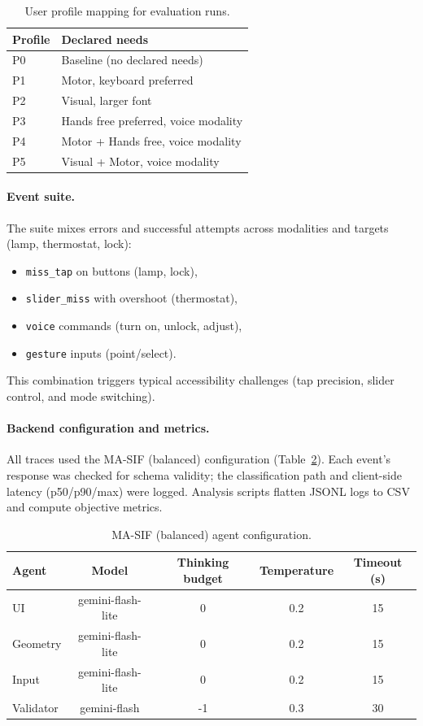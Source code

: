 \begin{table}[h]
\centering
\caption{User profile mapping for evaluation runs.}
\begin{tabular}{ll}
\toprule
\textbf{Profile} & \textbf{Declared needs} \\
\midrule
P0 & Baseline (no declared needs) \\
P1 & Motor, keyboard preferred \\
P2 & Visual, larger font \\
P3 & Hands free preferred, voice modality \\
P4 & Motor + Hands free, voice modality \\
P5 & Visual + Motor, voice modality \\
\bottomrule
\end{tabular}
\label{tab:user-profile-mapping}
\end{table}

\paragraph{Event suite.}
The suite mixes errors and successful attempts across modalities and targets (lamp, thermostat, lock):
\begin{itemize}
  \item \texttt{miss\_tap} on buttons (lamp, lock),
  \item \texttt{slider\_miss} with overshoot (thermostat),
  \item \texttt{voice} commands (turn on, unlock, adjust),
  \item \texttt{gesture} inputs (point/select).
\end{itemize}
This combination triggers typical accessibility challenges (tap precision, slider control, and mode switching).

\paragraph{Backend configuration and metrics.}
All traces used the MA-SIF (balanced) configuration (Table~\ref{tab:ma-sif-config}). Each event’s response was checked for schema validity; the classification path and client-side latency (p50/p90/max) were logged. Analysis scripts flatten JSONL logs to CSV and compute objective metrics.

\begin{table}[htb]
\centering
\caption{MA-SIF (balanced) agent configuration.}
\label{tab:ma-sif-config}
\begin{tabular}{lcccc}
\toprule
\textbf{Agent} & \textbf{Model} & \textbf{Thinking budget} & \textbf{Temperature} & \textbf{Timeout (s)} \\
\midrule
UI         & gemini-flash-lite & 0   & 0.2 & 15 \\
Geometry   & gemini-flash-lite & 0   & 0.2 & 15 \\
Input      & gemini-flash-lite & 0   & 0.2 & 15 \\
Validator  & gemini-flash      & -1  & 0.3 & 30 \\
\bottomrule
\end{tabular}
\end{table}

